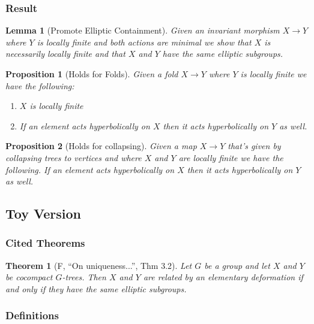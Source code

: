 \documentclass{article}
\theoremstyle{mystyle}
\newtheorem{thm}{Theorem}[section]
\newtheorem{lem}{Lemma}[section]
\newtheorem{pro}{Proposition}
\theoremstyle{remark}
\begin{document}
\subsubsection{Result}
\begin{lem}[Promote Elliptic Containment]
Given an invariant morphism $X \to Y$ where $Y$ is locally finite and both actions are minimal we show that $X$ is necessarily locally finite and that $X$ and $Y$ have the same elliptic subgroups.
\end{lem}

\begin{pro}[Holds for Folds]
Given a fold $X\to Y$ where $Y$ is locally finite we have the following:
\begin{enumerate}
    \item $X$ is locally finite
    \item If an element acts hyperbolically on $X$ then it acts hyperbolically on $Y$ as well.
\end{enumerate}

\end{pro}

\begin{pro}[Holds for collapsing]
Given a map $X\to Y$ that's given by collapsing trees to vertices and where $X$ and $Y$ are locally finite we have the following. If an element acts hyperbolically on $X$ then it acts hyperbolically on $Y$ as well.

\end{pro}

\subsection{Toy Version}

\subsubsection{Cited Theorems}

\begin{thm}[F, ``On uniqueness...'', Thm 3.2]
\label{thm:forester}
Let $G$ be a group and let $X$ and $Y$ be cocompact $G$-trees. Then $X$ and $Y$ are related by an elementary deformation if and only if they have the same elliptic subgroups.
\end{thm}

\subsubsection{Definitions}
\end{document}
